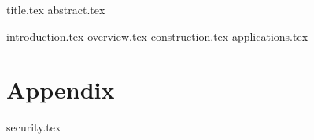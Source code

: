 \documentclass[11pt]{llncs}
\begin{document}
{title.tex}
\thispagestyle{plain}
{abstract.tex}

{introduction.tex}
{overview.tex}
{construction.tex}
{applications.tex}

\appendix
\section*{Appendix}
{security.tex}



\end{document}
